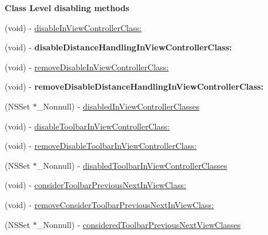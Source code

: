 \begin{Indent}\textbf{ Class Level disabling methods}\par
{\em 

 

 }\begin{DoxyCompactItemize}
\item 
(void) -\/ \mbox{\hyperlink{interface_i_q_keyboard_manager_a95cec0b3acf0d474e40883408b1c7785}{disable\+In\+View\+Controller\+Class\+:}}
\item 
\mbox{\label{interface_i_q_keyboard_manager_a9ceb61d3bd983a030f9c65cd1b8152c8}} 
(void) -\/ {\bfseries disable\+Distance\+Handling\+In\+View\+Controller\+Class\+:}
\item 
(void) -\/ \mbox{\hyperlink{interface_i_q_keyboard_manager_a816df2d7f4896490aba75e0e4172aca8}{remove\+Disable\+In\+View\+Controller\+Class\+:}}
\item 
\mbox{\label{interface_i_q_keyboard_manager_add246a2457d7aa32b4808f8682f66f8d}} 
(void) -\/ {\bfseries remove\+Disable\+Distance\+Handling\+In\+View\+Controller\+Class\+:}
\item 
(N\+S\+Set $\ast$\+\_\+\+Nonnull) -\/ \mbox{\hyperlink{interface_i_q_keyboard_manager_a37a563ed75b8487bf8378dcabfd27a70}{disabled\+In\+View\+Controller\+Classes}}
\item 
(void) -\/ \mbox{\hyperlink{interface_i_q_keyboard_manager_ab613a813f64570cb4c10e03887356692}{disable\+Toolbar\+In\+View\+Controller\+Class\+:}}
\item 
(void) -\/ \mbox{\hyperlink{interface_i_q_keyboard_manager_a71d38785360ac94f27319b3bf9119d9e}{remove\+Disable\+Toolbar\+In\+View\+Controller\+Class\+:}}
\item 
(N\+S\+Set $\ast$\+\_\+\+Nonnull) -\/ \mbox{\hyperlink{interface_i_q_keyboard_manager_a12b8e8101cbc5e318df61ef9a11d1bd5}{disabled\+Toolbar\+In\+View\+Controller\+Classes}}
\item 
(void) -\/ \mbox{\hyperlink{interface_i_q_keyboard_manager_a2d970d5680770d6aaced62a822b31958}{consider\+Toolbar\+Previous\+Next\+In\+View\+Class\+:}}
\item 
(void) -\/ \mbox{\hyperlink{interface_i_q_keyboard_manager_acd8d803c2aaaeab1204c709d81875a26}{remove\+Consider\+Toolbar\+Previous\+Next\+In\+View\+Class\+:}}
\item 
(N\+S\+Set $\ast$\+\_\+\+Nonnull) -\/ \mbox{\hyperlink{interface_i_q_keyboard_manager_a0a6fb3f3af6ffad0452480bbfc775c35}{considered\+Toolbar\+Previous\+Next\+View\+Classes}}

\end{DoxyCompactItemize}
\end{Indent}
